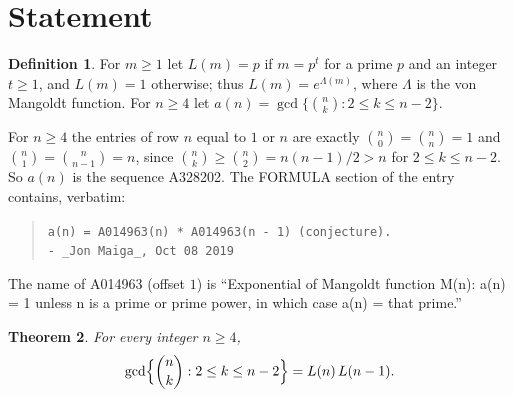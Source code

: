 \documentclass[11pt]{amsart}
\theoremstyle{plain}
\newtheorem{theorem}{Theorem}
\theoremstyle{definition}
\newtheorem{definition}[theorem]{Definition}
\begin{document}
\section{Statement}\label{sec:statement}

\begin{definition}\label{def:main}
For $m\ge1$ let $L(m)=p$ if $m=p^t$ for a prime $p$ and an integer $t\ge1$, and $L(m)=1$ otherwise; thus $L(m)=e^{\Lambda(m)}$, where $\Lambda$ is the von Mangoldt function. For $n\ge4$ let $a(n)=\gcd\{\binom nk : 2\le k\le n-2\}$.
\end{definition}

For $n\ge4$ the entries of row $n$ equal to $1$ or $n$ are exactly $\binom n0=\binom nn=1$ and $\binom n1=\binom n{n-1}=n$, since $\binom nk\ge\binom n2=n(n-1)/2>n$ for $2\le k\le n-2$. So $a(n)$ is the sequence A328202. The FORMULA section of the entry \cite{A328202} contains, verbatim:
\begin{quote}
{\small\texttt{a(n) = A014963(n) * A014963(n - 1) (conjecture).\\ - \_Jon Maiga\_, Oct 08 2019}}
\end{quote}
The name of A014963 \cite{A014963} (offset $1$) is ``Exponential of Mangoldt function M(n): a(n) = 1 unless n is a prime or prime power, in which case a(n) = that prime.''

\begin{theorem}\label{thm:main}
For every integer $n\ge4$,
\[
  \gcd\Bigl\{\binom nk : 2\le k\le n-2\Bigr\}=L(n)\,L(n-1).
\]
\end{theorem}
\end{document}
